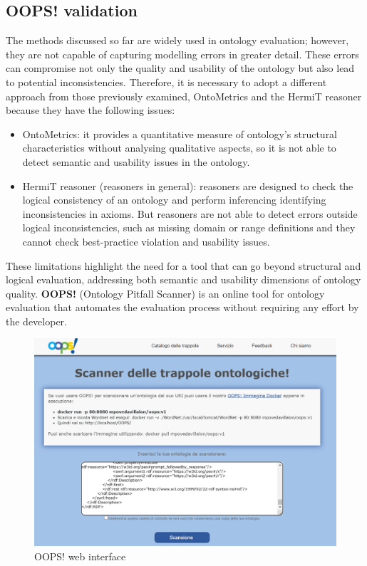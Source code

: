 \subsection{OOPS! validation}
The methods discussed so far are widely used in ontology evaluation; however, they are not capable of capturing modelling errors in greater detail. These errors can compromise not only the quality and usability of the ontology but also lead to potential inconsistencies. Therefore, it is necessary to adopt a different approach from those previously examined, OntoMetrics and the HermiT reasoner because they have the following issues:
\begin{itemize}
    \item OntoMetrics: it provides a quantitative measure of ontology's structural characteristics without analysing qualitative aspects, so it is not able to detect semantic and usability issues in the ontology.

    \item HermiT reasoner (reasoners in general): reasoners are designed to check the logical consistency of an ontology and perform inferencing identifying inconsistencies in axioms. But reasoners are not able to detect errors outside logical inconsistencies, such as missing domain or range definitions and they cannot check best-practice violation and usability issues.
\end{itemize}
These limitations highlight the need for a tool that can go beyond structural and logical evaluation, addressing both semantic and usability dimensions of ontology quality. \textbf{OOPS!} (Ontology Pitfall Scanner) is an online tool for ontology evaluation \cite{poveda2014oops} that automates the evaluation process without requiring any effort by the developer. 
\begin{figure}[H]
    \centering
    \includegraphics[width=0.9\linewidth]{Figures/fig_42.png}
    \caption{OOPS! web interface}
    \label{fig:enter-label}
\end{figure}
